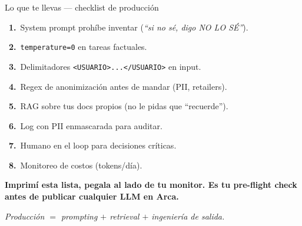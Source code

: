 \documentclass[aspectratio=169, 11pt]{beamer}
\begin{document}
\begin{frame}[shrink]{Lo que te llevas --- checklist de producción}
  \vspace{6pt}
  \begin{tcolorbox}[colback=arcaGray, colframe=arcaRed, leftrule=3pt,
    boxrule=0pt, sharp corners, left=8pt, right=8pt, top=6pt, bottom=6pt]
    {\footnotesize
    \faCheckSquare~\textbf{1.}~System prompt prohíbe inventar (\emph{``si no sé, digo NO LO SÉ''}).\par\vspace{4pt}
    \faCheckSquare~\textbf{2.}~\texttt{temperature=0} en tareas factuales.\par\vspace{4pt}
    \faCheckSquare~\textbf{3.}~Delimitadores \texttt{<USUARIO>...</USUARIO>} en input.\par\vspace{4pt}
    \faCheckSquare~\textbf{4.}~Regex de anonimización antes de mandar (PII, retailers).\par\vspace{4pt}
    \faCheckSquare~\textbf{5.}~RAG sobre tus docs propios (no le pidas que ``recuerde'').\par\vspace{4pt}
    \faCheckSquare~\textbf{6.}~Log con PII enmascarada para auditar.\par\vspace{4pt}
    \faCheckSquare~\textbf{7.}~Humano en el loop para decisiones críticas.\par\vspace{4pt}
    \faCheckSquare~\textbf{8.}~Monitoreo de costos (tokens/día).\par}
  \end{tcolorbox}
  \vspace{4pt}
  \begin{tcolorbox}[colback=arcaRed!8, colframe=arcaRed, leftrule=3pt,
    boxrule=0pt, sharp corners, left=8pt, right=8pt, top=3pt, bottom=3pt]
    {\footnotesize\color{arcaDark}\bfseries
    Imprimí esta lista, pegala al lado de tu monitor.
    Es tu pre-flight check antes de publicar cualquier LLM en Arca.\par
    \vspace{2pt}
    \emph{Producción $=$ prompting $+$ retrieval $+$ ingeniería de salida.}}
  \end{tcolorbox}
\end{frame}
\end{document}
